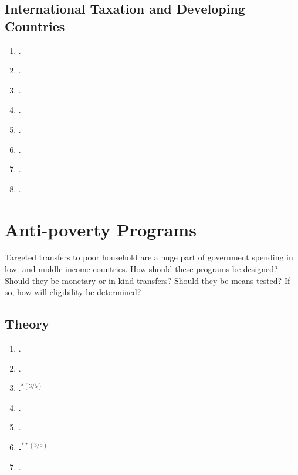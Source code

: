 \documentclass[11pt]{article}
\begin{document}
\subsection{International Taxation and Developing Countries}

\begin{enumerate}
\item {}.
\item {}.
\item {}.
\item {}.
\item {}.
\item {}.
\item {}.
\item {}.
\end{enumerate}

\section{ Anti-poverty Programs}
Targeted transfers to poor household are a huge part of government spending in low- and middle-income countries. How should these programs be designed? Should they be monetary or in-kind transfers? Should they be means-tested? If so, how will eligibility be determined?


\subsection{Theory}

\begin{enumerate}
\item {}.
\item {}.
\item {}.$^{*(3/5)}$
\item {}.
\item {}.
\item \textbf{.$^{**(3/5)}$}
\item {}.
\end{enumerate}
\end{document}
